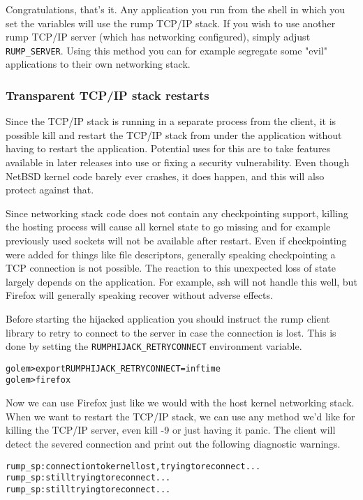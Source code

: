 Congratulations, that's it.  Any application you run from the shell
in which you set the variables will use the rump TCP/IP stack.  If you
wish to use another rump TCP/IP server (which has networking
configured), simply adjust \verb+RUMP_SERVER+.  Using this
method you can for example segregate some "evil" applications to
their own networking stack.

\subsubsection{Transparent TCP/IP stack restarts}

Since the TCP/IP stack is running in a separate process from the
client, it is possible kill and restart the TCP/IP stack from under
the application without having to restart the application.
Potential uses for this are to take features available in
later releases into use or fixing a security vulnerability.  Even
though NetBSD kernel code barely ever crashes, it does happen,
and this will also protect against that.

Since networking stack code does not contain any checkpointing
support, killing the hosting process will cause all kernel state
to go missing and for example previously used sockets will not be available
after restart.  Even if checkpointing were added for things like
file descriptors, generally speaking checkpointing a TCP connection
is not possible.  The reaction to this unexpected loss of state
largely depends on the application.  For example, ssh will not
handle this well, but Firefox will generally speaking recover
without adverse effects.

Before starting the hijacked application you should instruct the rump
client library to retry to connect to the server in case the
connection is lost.  This is done
by setting the \verb+RUMPHIJACK_RETRYCONNECT+ environment variable.

{\footnotesize
\begin{alltt}
golem> export RUMPHIJACK_RETRYCONNECT=inftime
golem> firefox
\end{alltt}}

Now we can use Firefox just like we would with the host kernel
networking stack.  When we want to restart the TCP/IP stack, we
can use any method we'd like for killing the TCP/IP server, even
kill -9 or just having it panic.  The client will detect the severed
connection and print out the following diagnostic warnings.

{\footnotesize
\begin{alltt}
rump_sp: connection to kernel lost, trying to reconnect ...
rump_sp: still trying to reconnect ...
rump_sp: still trying to reconnect ...
\end{alltt}}

